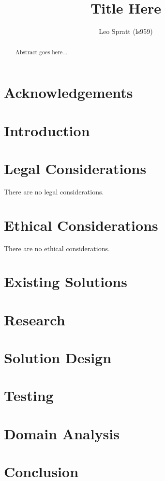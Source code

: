 \documentclass[a4paper,12pt]{report}
\title{
    {Title Here}\\
}
\author{Leo Spratt (ls959)}
\begin{document}
\maketitle

\begin{abstract}
    Abstract goes here...
\end{abstract}
\chapter{Acknowledgements}
% 
\tableofcontents
\newpage
\listoffigures
\newpage
\listoftables
\newpage
\lstlistoflistings
\newpage
\chapter{Introduction}

\chapter{Legal Considerations}
There are no legal considerations.
\chapter{Ethical Considerations}
There are no ethical considerations.
\chapter{Existing Solutions}

\chapter{Research}

\chapter{Solution Design}

\chapter{Testing}

\chapter{Domain Analysis}

\chapter{Conclusion}

\end{document}
